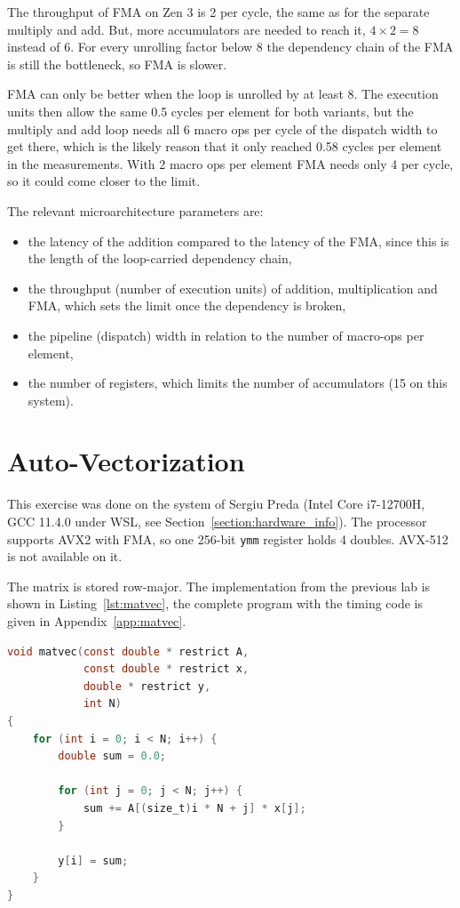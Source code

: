 \documentclass[a4paper,11pt]{article}
\begin{document}
The throughput of FMA on Zen 3 is 2 per cycle, the same as for the separate
multiply and add.
But, more accumulators are needed to reach it, $4 \times 2 = 8$ instead of 6.
For every unrolling factor below 8 the dependency chain of the FMA is still the bottleneck, so FMA is slower.

FMA can only be better when the loop is unrolled by at least 8.
The execution units then allow the same 0.5 cycles per element for both
variants, but the multiply and add loop needs all 6 macro ops per cycle of
the dispatch width to get there, which is the likely reason that it only
reached 0.58 cycles per element in the measurements. With 2 macro ops per
element FMA needs only 4 per cycle, so it could come closer to the limit.

The relevant microarchitecture parameters are:
\begin{itemize}
    \item the latency of the addition compared to the latency of the FMA,
    since this is the length of the loop-carried dependency chain,
    \item the throughput (number of execution units) of addition,
    multiplication and FMA, which sets the limit once the dependency is
    broken,
    \item the pipeline (dispatch) width in relation to the number of
    macro-ops per element,
    \item the number of registers, which limits the number of accumulators
    (15 on this system).
\end{itemize}

\section{Auto-Vectorization}

This exercise was done on the system of Sergiu Preda (Intel Core i7-12700H,
GCC 11.4.0 under WSL, see Section~\ref{section:hardware_info}). The processor
supports AVX2 with FMA, so one 256-bit \texttt{ymm} register holds 4 doubles.
AVX-512 is not available on it.

The matrix is stored row-major. The implementation from the previous lab is
shown in Listing~\ref{lst:matvec}, the complete program with the timing code
is given in Appendix~\ref{app:matvec}.

\begin{lstlisting}[language=C, caption={Matrix-vector multiplication (\texttt{matvec.c}).}, label={lst:matvec}]
void matvec(const double * restrict A,
            const double * restrict x,
            double * restrict y,
            int N)
{
    for (int i = 0; i < N; i++) {
        double sum = 0.0;

        for (int j = 0; j < N; j++) {
            sum += A[(size_t)i * N + j] * x[j];
        }

        y[i] = sum;
    }
}
\end{lstlisting}
\end{document}
